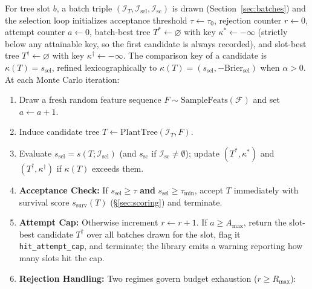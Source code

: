 \documentclass[11pt,a4paper]{article}
\newcommand{\code}[1]{\texttt{#1}}
\begin{document}
For tree slot $b$, a batch triple $(\mathcal{I}_T, \mathcal{I}_{\text{sel}}, \mathcal{I}_{\text{sc}})$ is drawn (Section~\ref{sec:batches}) and the selection loop initializes acceptance threshold $\tau \gets \tau_0$, rejection counter $r \gets 0$, attempt counter $a \gets 0$, batch-best tree $T^* \gets \varnothing$ with key $\kappa^* \gets -\infty$ (strictly below any attainable key, so the first candidate is always recorded), and slot-best tree $T^{\dagger} \gets \varnothing$ with key $\kappa^{\dagger} \gets -\infty$. The comparison key of a candidate is $\kappa(T) = s_{\text{sel}}$, refined lexicographically to $\kappa(T) = (s_{\text{sel}}, -\text{Brier}_{\text{sel}})$ when $\alpha > 0$. At each Monte Carlo iteration:
\begin{enumerate}[leftmargin=*, itemsep=3pt]
  \item Draw a fresh random feature sequence $F \sim \text{SampleFeats}(\mathcal{F})$ and set $a \gets a + 1$.
  \item Induce candidate tree $T \gets \text{PlantTree}(\mathcal{I}_T, F)$.
  \item Evaluate $s_{\text{sel}} = s(T; \mathcal{I}_{\text{sel}})$ (and $s_{\text{sc}}$ if $\mathcal{I}_{\text{sc}} \neq \emptyset$); update $(T^*, \kappa^*)$ and $(T^{\dagger}, \kappa^{\dagger})$ if $\kappa(T)$ exceeds them.
  \item \textbf{Acceptance Check:} If $s_{\text{sel}} \ge \tau$ \textbf{and} $s_{\text{sel}} \ge \tau_{\min}$, accept $T$ immediately with survival score $s_{\text{surv}}(T)$ (\S\ref{sec:scoring}) and terminate.
  \item \textbf{Attempt Cap:} Otherwise increment $r \gets r + 1$. If $a \ge A_{\max}$, return the slot-best candidate $T^{\dagger}$ over all batches drawn for the slot, flag it \code{hit\_attempt\_cap}, and terminate; the library emits a warning reporting how many slots hit the cap.
  \item \textbf{Rejection Handling:} Two regimes govern budget exhaustion ($r \ge R_{\max}$):
\end{enumerate}
\end{document}
